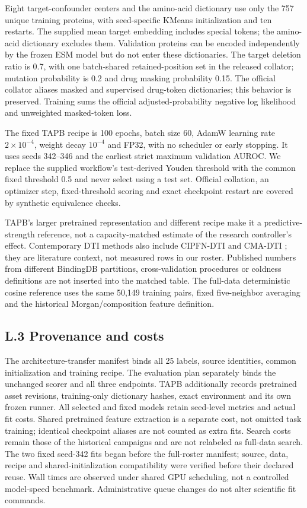 Eight target-confounder centers and the amino-acid dictionary use only the 757 unique training proteins, with seed-specific KMeans initialization and ten restarts. The supplied mean target embedding includes special tokens; the amino-acid dictionary excludes them. Validation proteins can be encoded independently by the frozen ESM model but do not enter these dictionaries. The target deletion ratio is 0.7, with one batch-shared retained-position set in the released collator; mutation probability is 0.2 and drug masking probability 0.15. The official collator aliases masked and supervised drug-token dictionaries; this behavior is preserved. Training sums the official adjusted-probability negative log likelihood and unweighted masked-token loss.

The fixed TAPB recipe is 100 epochs, batch size 60, AdamW learning rate $2\times10^{-4}$, weight decay $10^{-4}$ and FP32, with no scheduler or early stopping. It uses seeds 342--346 and the earliest strict maximum validation AUROC. We replace the supplied workflow's test-derived Youden threshold with the common fixed threshold 0.5 and never select using a test set. Official collation, an optimizer step, fixed-threshold scoring and exact checkpoint restart are covered by synthetic equivalence checks.

TAPB's larger pretrained representation and different recipe make it a predictive-strength reference, not a capacity-matched estimate of the research controller's effect. Contemporary DTI methods also include CIPFN-DTI \citep{cao2025cipfn} and CMA-DTI \citep{qin2026cmadti}; they are literature context, not measured rows in our roster. Published numbers from different BindingDB partitions, cross-validation procedures or coldness definitions are not inserted into the matched table. The full-data deterministic cosine reference uses the same 50,149 training pairs, fixed five-neighbor averaging and the historical Morgan/composition feature definition.

\subsection*{L.3 Provenance and costs}
The architecture-transfer manifest binds all 25 labels, source identities, common initialization and training recipe. The evaluation plan separately binds the unchanged scorer and all three endpoints. TAPB additionally records pretrained asset revisions, training-only dictionary hashes, exact environment and its own frozen runner. All selected and fixed models retain seed-level metrics and actual fit costs. Shared pretrained feature extraction is a separate cost, not omitted task training; identical checkpoint aliases are not counted as extra fits. Search costs remain those of the historical campaigns and are not relabeled as full-data search. The two fixed seed-342 fits began before the full-roster manifest; source, data, recipe and shared-initialization compatibility were verified before their declared reuse. Wall times are observed under shared GPU scheduling, not a controlled model-speed benchmark. Administrative queue changes do not alter scientific fit commands.

